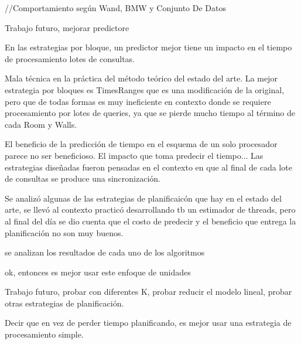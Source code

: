 //Comportamiento según Wand, BMW y Conjunto De Datos 

Trabajo futuro, mejorar predictore

En las estrategias por bloque, un predictor mejor tiene un impacto en el tiempo de procesamiento lotes de consultas.

Mala técnica en la práctica del método teórico del estado del arte. La mejor estrategia por bloques es TimesRanges que es una modificación de la original, pero que de todas formas es muy ineficiente en contexto donde se requiere procesamiento por lotes de queries, ya que se pierde mucho tiempo al término de cada Room y Walls. 

El beneficio de la predicción de tiempo en el esquema de un solo procesador parece no ser beneficioso. 
El impacto que toma predecir el tiempo...
Las estrategias diseñadas fueron pensadas en el contexto en que al final de cada lote de consultas se produce una sincronización.

Se analizó algunas de las estrategias de planificaicón que hay en el estado del arte, se llevó al contexto practicó desarrollando tb un estimador de threads, pero al final del día se dio cuenta que el costo de predecir y el beneficio que entrega la planificación no son muy buenos.

se analizan los resultados de cada uno de los algoritmos


ok, entonces es mejor usar este enfoque de unidades


Trabajo futuro, probar con diferentes K, probar reducir el modelo lineal, probar otras estrategias de planificación.



Decir que en vez de perder tiempo planificando, es mejor usar una estrategia de procesamiento simple. 

